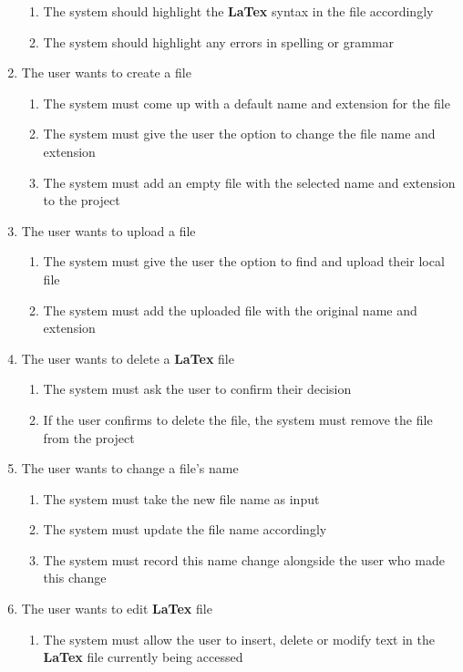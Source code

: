 \documentclass[12pt, titlepage]{article}
\begin{document}
\begin{enumerate}[{BE}1.]
\begin{enumerate}[resume*]
			\item The system should highlight the \textbf{LaTex} syntax in the file accordingly
			\item The system should highlight any errors in spelling or grammar
		\end{enumerate}
		\item The user wants to create a file
		\begin{enumerate}[resume*]
			\item The system must come up with a default name and extension for the file
			\item The system must give the user the option to change the file name and extension
			\item The system must add an empty file with the selected name and extension to the project
		\end{enumerate}
		\item The user wants to upload a file
		\begin{enumerate}[resume*]
			\item The system must give the user the option to find and upload their local file
			\item The system must add the uploaded file with the original name and extension
		\end{enumerate}
		\item The user wants to delete a \textbf{LaTex} file
		\begin{enumerate}[resume*]
			\item The system must ask the user to confirm their decision
			\item If the user confirms to delete the file, the system must remove the file from the project
		\end{enumerate}
		\item The user wants to change a file's name
		\begin{enumerate}[resume*]
			\item The system must take the new file name as input
			\item The system must update the file name accordingly
			\item The system must record this name change alongside the user who made this change
		\end{enumerate}
		\item The user wants to edit \textbf{LaTex} file
		\begin{enumerate}[resume*]
			\item The system must allow the user to insert, delete or modify text in the \textbf{LaTex} file currently being accessed\\
			

\end{enumerate}
\end{enumerate}
\end{document}
